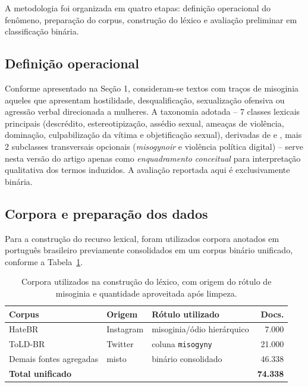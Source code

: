 \documentclass[12pt]{article}
\begin{document}
A metodologia foi organizada em quatro etapas: defini\c{c}\~ao operacional
do fen\^omeno, prepara\c{c}\~ao do corpus, constru\c{c}\~ao do l\'exico
e avalia\c{c}\~ao preliminar em classifica\c{c}\~ao bin\'aria.

\subsection{Defini\c{c}\~ao operacional}

Conforme apresentado na Se\c{c}\~ao 1, consideram-se textos com tra\c{c}os
de misoginia aqueles que apresentam hostilidade, desqualifica\c{c}\~ao,
sexualiza\c{c}\~ao ofensiva ou agress\~ao verbal direcionada a mulheres.
A taxonomia adotada -- 7 classes lexicais principais (descr\'edito,
estereotipiza\c{c}\~ao, ass\'edio sexual, amea\c{c}as de viol\^encia,
domina\c{c}\~ao, culpabiliza\c{c}\~ao da v\'itima e objetifica\c{c}\~ao
sexual), derivadas de \cite{anzovino2018} e \cite{sultana2021}, mais 2
subclasses transversais opcionais (\emph{misogynoir} e viol\^encia
pol\'itica digital) -- serve nesta vers\~ao do artigo apenas como
\emph{enquadramento conceitual} para interpreta\c{c}\~ao qualitativa dos
termos induzidos. A avalia\c{c}\~ao reportada aqui \'e exclusivamente
bin\'aria.

\subsection{Corpora e prepara\c{c}\~ao dos dados}

Para a constru\c{c}\~ao do recurso lexical, foram utilizados corpora
anotados em portugu\^es brasileiro previamente consolidados em um corpus
bin\'ario unificado, conforme a Tabela~\ref{tab:corpora}.

\begin{table}[ht]
\centering
\caption{Corpora utilizados na constru\c{c}\~ao do l\'exico, com origem
do r\'otulo de misoginia e quantidade aproveitada ap\'os limpeza.}
\label{tab:corpora}
\begin{tabular}{lllr}
\toprule
\textbf{Corpus} & \textbf{Origem} & \textbf{R\'otulo utilizado} &
\textbf{Docs.} \\
\midrule
HateBR \cite{vargas2022hatebr}      & Instagram & misoginia/\'odio
                                                 hier\'arquico & 7.000 \\
ToLD-BR \cite{leite2020toldbr}      & Twitter   & coluna \texttt{misogyny}
                                                                 & 21.000 \\
Demais fontes agregadas             & misto     & bin\'ario consolidado
                                                                 & 46.338 \\
\midrule
\textbf{Total unificado}            &           &
                                                & \textbf{74.338} \\
\bottomrule
\end{tabular}
\end{table}
\end{document}

